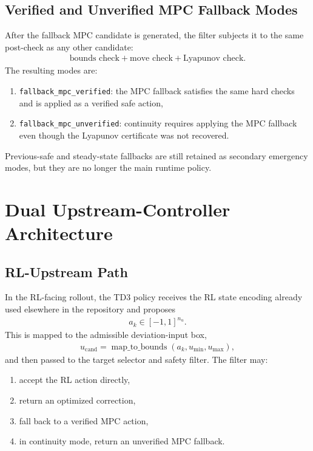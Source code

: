 \documentclass[11pt]{article}
\begin{document}
\subsection{Verified and Unverified MPC Fallback Modes}
After the fallback MPC candidate is generated, the filter subjects it to the same post-check as any other candidate:
\begin{align}
\text{bounds check} + \text{move check} + \text{Lyapunov check}.
\end{align}
The resulting modes are:
\begin{enumerate}[leftmargin=*]
\item \texttt{fallback\_mpc\_verified}: the MPC fallback satisfies the same hard checks and is applied as a verified safe action,
\item \texttt{fallback\_mpc\_unverified}: continuity requires applying the MPC fallback even though the Lyapunov certificate was not recovered.
\end{enumerate}
Previous-safe and steady-state fallbacks are still retained as secondary emergency modes, but they are no longer the main runtime policy.

\section{Dual Upstream-Controller Architecture}
\subsection{RL-Upstream Path}
In the RL-facing rollout, the TD3 policy receives the RL state encoding already used elsewhere in the repository and proposes
\begin{align}
a_k \in [-1,1]^{n_u}.
\end{align}
This is mapped to the admissible deviation-input box,
\begin{align}
u_{\mathrm{cand}} = \operatorname{map\_to\_bounds}(a_k,u_{\min},u_{\max}), \label{eq:rl_map}
\end{align}
and then passed to the target selector and safety filter. The filter may:
\begin{enumerate}[leftmargin=*]
\item accept the RL action directly,
\item return an optimized correction,
\item fall back to a verified MPC action,
\item in continuity mode, return an unverified MPC fallback.
\end{enumerate}
\end{document}
